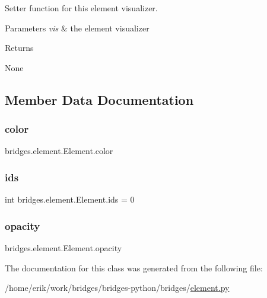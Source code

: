 Setter function for this element visualizer. 


\begin{DoxyParams}{Parameters}
{\em vis} & the element visualizer \\
\hline
\end{DoxyParams}
\begin{DoxyReturn}{Returns}


None 
\end{DoxyReturn}


\subsection{Member Data Documentation}
\mbox{\label{classbridges_1_1element_1_1_element_a568fd16a353d7852571aa947433095ea}} 
\subsubsection{\texorpdfstring{color}{color}}
{\footnotesize\ttfamily bridges.\+element.\+Element.\+color}

\mbox{\label{classbridges_1_1element_1_1_element_a61f02c915a65554b76dd6534e5a4d834}} 
\subsubsection{\texorpdfstring{ids}{ids}}
{\footnotesize\ttfamily int bridges.\+element.\+Element.\+ids = 0\hspace{0.3cm}{\ttfamily [static]}}

\mbox{\label{classbridges_1_1element_1_1_element_a5af50d5fc696eb8c295245bd5d1c0c91}} 
\subsubsection{\texorpdfstring{opacity}{opacity}}
{\footnotesize\ttfamily bridges.\+element.\+Element.\+opacity}



The documentation for this class was generated from the following file\+:\begin{DoxyCompactItemize}
\item 
/home/erik/work/bridges/bridges-\/python/bridges/\hyperlink{element_8py}{element.\+py}\end{DoxyCompactItemize}
